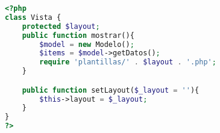 \begin{lstlisting}[label=mvc_vista,caption=Clase Vista,language=PHP]
<?php
class Vista {
	protected $layout;
    public function mostrar(){
    	$model = new Modelo();
    	$items = $model->getDatos();
    	require 'plantillas/' . $layout . '.php';
    }

	public function setLayout($_layout = ''){
    	$this->layout = $_layout;
    }
}
?>
\end{lstlisting}
